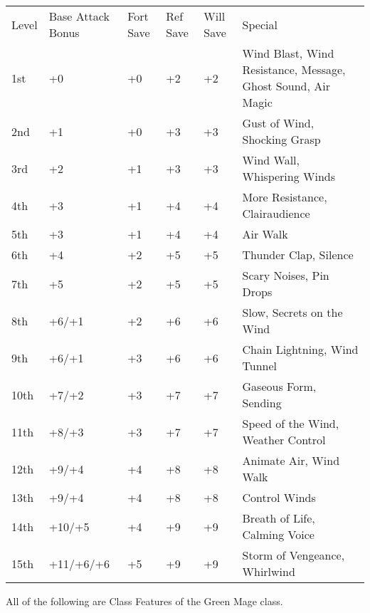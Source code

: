 \begin{table}[tbh]
\begin{small}
\begin{tabular}{lp{2cm}p{1cm}p{1cm}p{0.7cm}l}
Level  &Base Attack Bonus &Fort Save &Ref Save &Will Save &Special\\
1st &+0 &+0 &+2 &+2 &Wind Blast, Wind Resistance, Message, Ghost Sound, Air Magic\\
2nd &+1 &+0 &+3 &+3 &Gust of Wind, Shocking Grasp\\
3rd &+2 &+1 &+3 &+3 &Wind Wall, Whispering Winds\\
4th &+3 &+1 &+4 &+4 &More Resistance, Clairaudience\\
5th &+3 &+1 &+4 &+4 &Air Walk\\
6th &+4 &+2 &+5 &+5 &Thunder Clap, Silence\\
7th &+5 &+2 &+5 &+5 &Scary Noises, Pin Drops\\
8th &+6/+1 &+2 &+6 &+6 &Slow, Secrets on the Wind\\
9th &+6/+1 &+3 &+6 &+6 &Chain Lightning, Wind Tunnel\\
10th &+7/+2 &+3 &+7 &+7 &Gaseous Form, Sending\\
11th &+8/+3 &+3 &+7 &+7 &Speed of the Wind, Weather Control\\
12th &+9/+4 &+4 &+8 &+8 &Animate Air, Wind Walk\\
13th &+9/+4 &+4 &+8 &+8 &Control Winds\\
14th &+10/+5 &+4 &+9 &+9 &Breath of Life, Calming Voice\\
15th &+11/+6/+6 &+5 &+9 &+9 &Storm of Vengeance, Whirlwind\\
\end{tabular}
\end{small}
\end{table}

\smallskip\noindent All of the following are Class Features of the Green Mage class.



